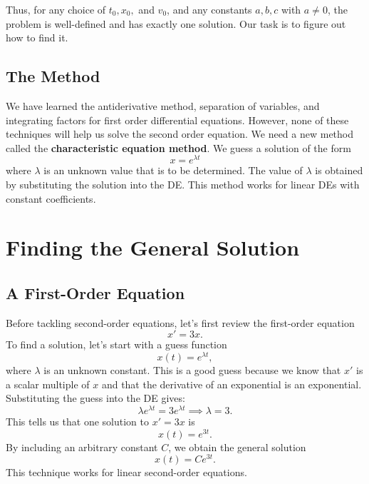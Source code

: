 \documentclass[10pt,letterpaper]{article}
\begin{document}
Thus, for any choice of $t_0,x_0,$ and $v_0$, and any constants $a,b,c$ with $a\neq0$, the problem is well-defined and has exactly one solution. Our task is to figure out how to find it.

\subsection{The Method}
We have learned the antiderivative method, separation of variables, and integrating factors for first order differential equations. However, none of these techniques will help us solve the second order equation. We need a new method called the \textbf{characteristic equation method}. We guess a solution of the form 
$$
    x = e^{\lambda t}
$$
where $\lambda$ is an unknown value that is to be determined. The value of $\lambda$ is obtained by substituting the solution into the DE. This method works for linear DEs with constant coefficients.


\section{Finding the General Solution}

\subsection{A First-Order Equation}
Before tackling second-order equations, let's first review the first-order equation
\[
x' = 3x.
\]
To find a solution, let's start with a guess function 
\[
x(t)=e^{\lambda t},
\]
where $\lambda$ is an unknown constant. This is a good guess because we know that $x'$ is a scalar multiple of $x$ and that the derivative of an exponential is an exponential.
Substituting the guess into the DE gives:
\[
\lambda e^{\lambda t} = 3e^{\lambda t} \implies \lambda=3.
\]
This tells us that one solution to $x'=3x$ is
\[
x(t)=e^{3t}.
\]
By including an arbitrary constant $C$, we obtain the general solution
\[
x(t)=Ce^{3t}.
\]
This technique works for linear second-order equations.

\end{document}
